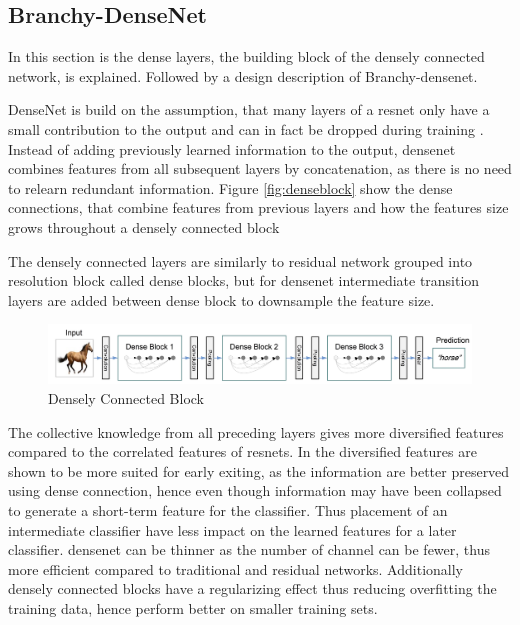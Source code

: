 \subsection{Branchy-DenseNet}

In this section is the dense layers, the building block of the densely connected network, is explained. Followed by a design description of Branchy-\gls{densenet}.

DenseNet \cite{huang_densely_2016} is build on the assumption, that many layers of a \gls{resnet} only have a small contribution to the output and can in fact be dropped during training \cite{huang_densely_2016}. Instead of adding previously learned information to the output, \gls{densenet} combines features from all subsequent layers by concatenation, as there is no need to relearn redundant information. Figure \ref{fig:denseblock} show the dense connections, that combine features from previous layers and how the features size grows throughout a densely connected block 


The densely connected layers are similarly to residual network grouped into resolution block called dense blocks, but for \gls{densenet} intermediate transition layers are added between dense block to downsample the feature size. 

\begin{figure}
	\centering
	\includegraphics[width=\linewidth]{figures/models/densenet}
	\caption[Densely Connected Block]{Densely Connected Block}
	\label{fig:densenet}
\end{figure}

The collective knowledge from all preceding layers gives more diversified features compared to the correlated features of \gls{resnet}s. In \cite{huang_multi-scale_2017} the diversified features are shown to be more suited for early exiting,  as the information are better preserved using dense connection, hence even though information may have been collapsed to generate a short-term feature for the classifier. Thus placement of an intermediate classifier have less impact on the learned features for a later classifier. \gls{densenet} can be thinner as the number of channel can be fewer, thus more efficient compared to traditional and residual networks. Additionally densely connected blocks have a regularizing effect thus reducing overfitting the training data, hence perform better on smaller training sets. 

